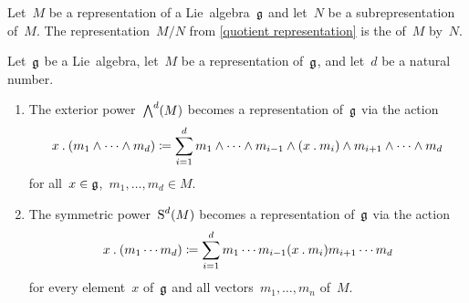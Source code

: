 \begin{definition}
  Let~$M$ be a representation of a Lie~algebra~$\mathfrak{g}$ and let~$N$ be a subrepresentation of~$M$.
  The representation~$M/N$ from \cref{quotient representation} is the  of~$M$ by~$N$.
\end{definition}


\begin{lemma}
  Let~$\mathfrak{g}$ be a Lie~algebra, let~$M$ be a representation of~$\mathfrak{g}$, and let~$d$ be a natural number.
  \begin{enumerate}
    \item
      The exterior power~$\operatorname{\bigwedge}^d(M)$ becomes a representation of~$\mathfrak{g}$ via the action
      \[
        x \mathbin{.} (m_1 \wedge \dotsb \wedge m_d)
        \coloneqq
        \sum_{i=1}^d
        m_1 \wedge \dotsb \wedge m_{i-1} \wedge (x \mathbin{.} m_i) \wedge m_{i+1} \wedge \dotsb \wedge m_d
      \]
      for all~$x \in \mathfrak{g}$,~$m_1, \dotsc, m_d \in M$.
    \item
      The symmetric power~$\operatorname{S}^d(M)$ becomes a representation of~$\mathfrak{g}$ via the action
      \[
        x \mathbin{.} (m_1 \dotsm m_d)
        \coloneqq
        \sum_{i=1}^d
        m_1 \dotsm m_{i-1} (x \mathbin{.} m_i) m_{i+1} \dotsm m_d
      \]
      for every element~$x$ of~$\mathfrak{g}$ and all vectors~$m_1, \dotsc, m_n$ of~$M$.
  \end{enumerate}
\end{lemma}


